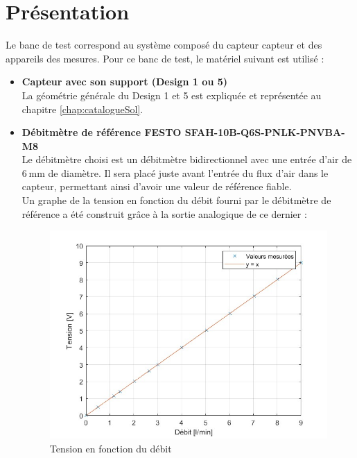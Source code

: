 
\section{Présentation}
Le banc de test correspond au système composé du capteur \gls{capteur} et des appareils des mesures. Pour ce banc de test, le matériel suivant est utilisé :
\begin{itemize}
    \item \textbf{Capteur avec son support (Design 1 ou 5)}\\
          La géométrie générale du Design 1 et 5 est expliquée et représentée au chapitre \ref*{chap:catalogueSol}. \\
          
    \item \textbf{Débitmètre de référence FESTO SFAH-10B-Q6S-PNLK-PNVBA-M8}\\
          Le débitmètre choisi est un débitmètre bidirectionnel avec une entrée d'air de 6 mm de diamètre. Il sera placé juste avant l'entrée du flux
          d'air dans le capteur, permettant ainsi d'avoir une valeur de référence fiable.\\
          
          Un graphe de la tension en fonction du débit fourni par le débitmètre de référence a été construit grâce à la sortie analogique de ce dernier :
          \begin{figure}[H]
              \centering
              \includegraphics[scale = 0.4]{assets/figures/Calibration_maison.jpg}
              \caption{Tension en fonction du débit}
              \label{fig:calibration}
          \end{figure}
          

\end{itemize}
